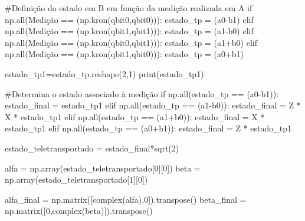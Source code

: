\begin{pycode}
    #Definição do estado em B em função da medição realizada em A
	if  np.all(Medição == (np.kron(qbit0,qbit0))):
    		estado_tp = (a0-b1)
	elif  np.all(Medição == (np.kron(qbit1,qbit1))):
    		estado_tp = (a1-b0)
	elif  np.all(Medição == (np.kron(qbit0,qbit1))):
   		estado_tp = (a1+b0)
	elif np.all(Medição == (np.kron(qbit1,qbit0))):
    		estado_tp = (a0+b1)
    
	estado_tp1=estado_tp.reshape(2,1)   
	print(estado_tp1)
		
	#Determina o estado associado à medição	
		if np.all(estado_tp == (a0-b1)):
    			estado_final = estado_tp1
		elif np.all(estado_tp == (a1-b0)):
    			estado_final = Z * X * estado_tp1 
		elif np.all(estado_tp == (a1+b0)):
   			estado_final = X * estado_tp1 
		elif np.all(estado_tp == (a0+b1)):
   			estado_final = Z * estado_tp1 
    
	estado_teletransportado = estado_final*sqrt(2)    

	alfa = np.array(estado_teletransportado[0][0])
	beta = np.array(estado_teletransportado[1][0])

	alfa_final = np.matrix([complex(alfa),0]).transpose()
	beta_final = np.matrix([0,complex(beta)]).transpose()
\end{pycode}

